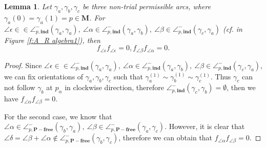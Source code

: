 \documentclass[a4paper,10pt]{amsart}
\theoremstyle{plain}          %
\newtheorem{lemma}[theorem]{Lemma}
\theoremstyle{definition}
\def\MM{\mathbf{M}}
\def\MM{\mathbf{M}}
\newcommand{\appfree}{\angle^-_{p,\mathbf{P-free}}}
\newcommand{\ha}{\angle^-}
\begin{document}
\begin{lemma}\label{l:p_alpha=p_beta}
  Let $\gamma_a,\gamma_b,\gamma_c$ be three non-trial permissible arcs, where $\gamma_a(0)=\gamma_a(1)=p\in\MM$. For  $\angle \epsilon\in \in\ha_{p,\mathbf{ind}}(\gamma_a,\gamma_a), ~\angle\alpha\in\ha_{p,\mathbf{ind}}(\gamma_a,\gamma_b),~\angle\beta\in\ha_{p,\mathbf{ind}}(\gamma_c,\gamma_a)$ ({\em cf.}  in Figure \ref{f:A_R algebra1}), then $$f_{\angle \epsilon}f_{\angle \epsilon}=0,  f_{\angle\beta} f_{\angle\alpha}=0.$$
\end{lemma}
\begin{proof}
Since $\angle \epsilon\in \in\ha_{p,\mathbf{ind}}(\gamma_a,\gamma_a), ~\angle\alpha\in\ha_{p,\mathbf{ind}}(\gamma_a,\gamma_b),~\angle\beta\in\ha_{p,\mathbf{ind}}(\gamma_c,\gamma_a)$, we can
fix orientations of $\gamma_a,\gamma_b,\gamma_c$ such that 
$\gamma_{a}^{(1)}\sim\gamma_{b}^{(1)}\sim\gamma_{c}^{(1)}.$
Thus  $\gamma_c$ can not follow $\gamma_b$ at $p_\alpha$ in clockwise direction, therefore $\ha_{p,\mathbf{ind}}(\gamma_c,\gamma_b)=\emptyset$, then we have $f_{\angle\alpha} f_{\angle\beta}=0$. 

For the second case, we know that $\angle\alpha\in\appfree(\gamma_b,\gamma_a),~\angle\beta\in\appfree(\gamma_a,\gamma_c)$. However, it is clear that $\angle\delta=\angle\beta+\angle\alpha\notin\appfree(\gamma_b,\gamma_c)$, therefore we can obtain that $f_{\angle\alpha} f_{\angle\beta}=0$.
\end{proof}
\fi
\end{document}
